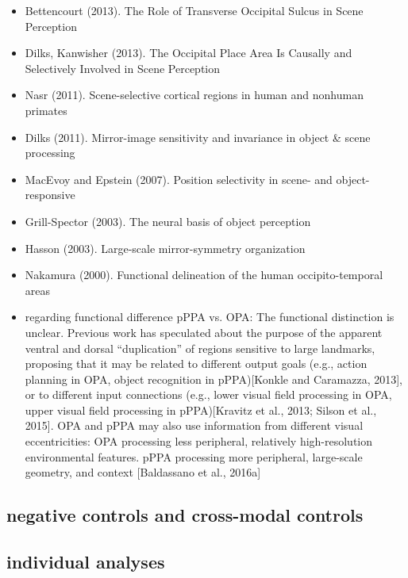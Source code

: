\documentclass[english]{article}
\begin{document}
\begin{itemize}
\item Bettencourt (2013). The Role of Transverse Occipital Sulcus in Scene
    Perception
\item Dilks, Kanwisher (2013). The Occipital Place Area Is Causally and
    Selectively Involved in Scene Perception
\item Nasr (2011). Scene-selective cortical regions in human and nonhuman
    primates
\item Dilks (2011). Mirror-image sensitivity and invariance in object \& scene
    processing
\item MacEvoy and Epstein (2007). Position selectivity in scene- and
    object-responsive
\item Grill-Spector (2003). The neural basis of object perception
\item Hasson (2003). Large-scale mirror-symmetry organization
\item Nakamura (2000). Functional delineation of the human occipito-temporal
    areas
\item \citep{baldassano2016two} regarding functional difference pPPA vs. OPA:
    The functional distinction is unclear.
    Previous work has speculated about the purpose of the apparent ventral and
    dorsal ``duplication'' of regions sensitive to large landmarks, proposing
    that it may be related to different output goals (e.g., action planning in
    OPA, object recognition in pPPA)[Konkle and Caramazza, 2013], or to
    different input connections (e.g., lower visual field processing in OPA,
    upper visual field processing in pPPA)[Kravitz et al., 2013; Silson et al.,
    2015].
    OPA and pPPA may also use information from different visual
    eccentricities: OPA processing less peripheral, relatively high-resolution
    environmental features. pPPA processing more peripheral, large-scale
    geometry, and context [Baldassano et al., 2016a]
\end{itemize}


\subsection{negative controls and cross-modal controls}



\subsection{individual analyses}
\end{document}
